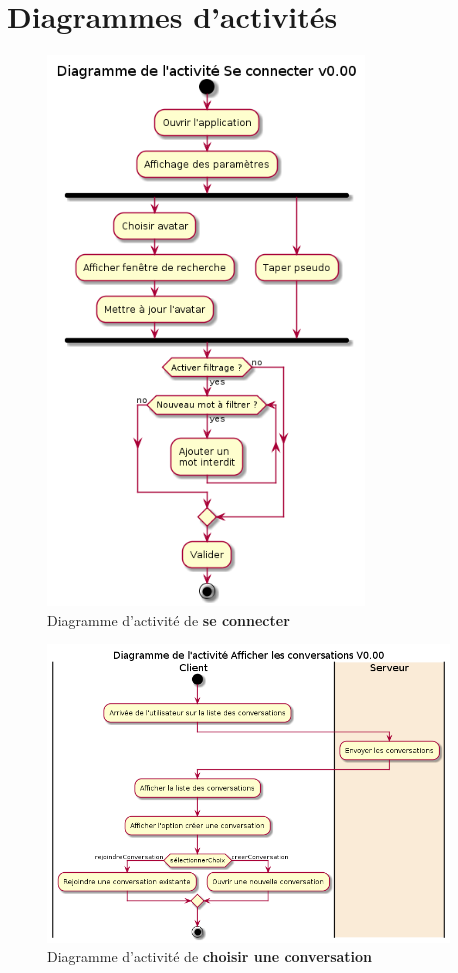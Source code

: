 \documentclass[11pt,dvipsnames,svgnames]{report}
\begin{document}
\section{Diagrammes d'activités}
\begin{figure}[H]
\caption{Diagramme d'activité de \textbf{se connecter}}
\centerline{\includegraphics[width=0.75\textwidth]{diagrammes/activity-settings-diag.png}}
\end{figure}

\begin{figure}[H]
\caption{Diagramme d'activité de \textbf{choisir une conversation}}
\centerline{\includegraphics[width=0.95\textwidth]{diagrammes/activity-convList-diag.png}}
\end{figure}
\end{document}
